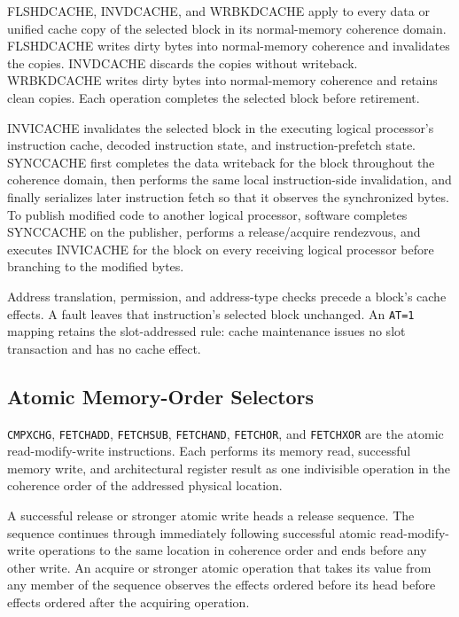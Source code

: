 FLSHDCACHE, INVDCACHE, and WRBKDCACHE apply to every data or unified cache copy of the selected block in its
normal-memory coherence domain. FLSHDCACHE writes dirty bytes into normal-memory coherence and invalidates the
copies. INVDCACHE discards the copies without writeback. WRBKDCACHE writes dirty bytes into normal-memory coherence
and retains clean copies. Each operation completes the selected block before retirement.

INVICACHE invalidates the selected block in the executing logical processor's instruction cache, decoded
instruction state, and instruction-prefetch state. SYNCCACHE first completes the data writeback for the block
throughout the coherence domain, then performs the same local instruction-side invalidation, and finally serializes
later instruction fetch so that it observes the synchronized bytes. To publish modified code to another logical
processor, software completes SYNCCACHE on the publisher, performs a release/acquire rendezvous, and executes
INVICACHE for the block on every receiving logical processor before branching to the modified bytes.

Address translation, permission, and address-type checks precede a block's cache effects. A fault leaves that
instruction's selected block unchanged. An \texttt{AT=1} mapping retains the slot-addressed rule: cache maintenance
issues no slot transaction and has no cache effect.

\subsection{Atomic Memory-Order Selectors}


\texttt{CMPXCHG}, \texttt{FETCHADD}, \texttt{FETCHSUB}, \texttt{FETCHAND}, \texttt{FETCHOR}, and
\texttt{FETCHXOR} are the atomic read-modify-write instructions. Each performs its memory read, successful memory
write, and architectural register result as one indivisible operation in the coherence order of the addressed
physical location.

A successful release or stronger atomic write heads a release sequence. The sequence continues through immediately
following successful atomic read-modify-write operations to the same location in coherence order and ends before any
other write. An acquire or stronger atomic operation that takes its value from any member of the sequence observes
the effects ordered before its head before effects ordered after the acquiring operation.

